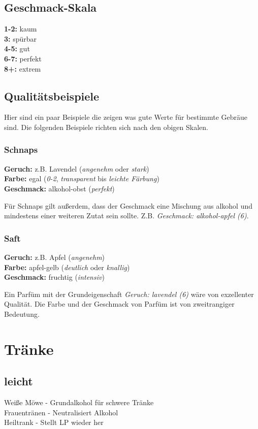 \subsection{Geschmack-Skala}
\textbf{1-2:} kaum \\
\textbf{3:} spürbar \\
\textbf{4-5:} gut \\
\textbf{6-7:} perfekt \\
\textbf{8+:} extrem

\subsection{Qualitätsbeispiele}
Hier sind ein paar Beispiele die zeigen was gute Werte für bestimmte Gebräue sind. Die folgenden Beispiele richten sich nach den obigen Skalen.

\subsubsection{Schnaps}
\textbf{Geruch:} z.B. Lavendel (\textit{angenehm} oder \textit{stark}) \\
\textbf{Farbe:} egal (\textit{0-2}, \textit{transparent} bis \textit{leichte Färbung}) \\
\textbf{Geschmack:} alkohol-obst (\textit{perfekt})

Für Schnaps gilt außerdem, dass der Geschmack eine Mischung aus alkohol und mindestens einer weiteren Zutat sein sollte. Z.B. \textit{Geschmack: alkohol-apfel (6)}.

\subsubsection{Saft}
\textbf{Geruch:} z.B. Apfel (\textit{angenehm}) \\
\textbf{Farbe:} apfel-gelb (\textit{deutlich} oder \textit{knallig}) \\
\textbf{Geschmack:} fruchtig (\textit{intensiv})

Ein Parfüm mit der Grundeigenschaft \textit{Geruch: lavendel (6)} wäre von exzellenter Qualität. Die Farbe und der Geschmack von Parfüm ist von zweitrangiger Bedeutung.





\section{Tränke}
\label{chap:traenke}
\subsection{leicht}
Weiße Möwe - Grundalkohol für schwere Tränke \\
Frauentränen - Neutralisiert Alkohol \\
Heiltrank - Stellt LP wieder her \\

